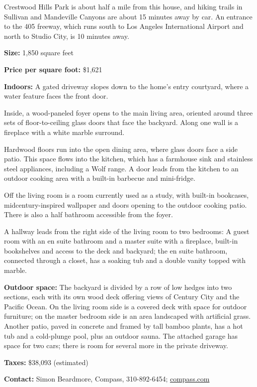 Crestwood Hills Park is about half a mile from this house, and hiking
trails in Sullivan and Mandeville Canyons are about 15 minutes away by
car. An entrance to the 405 freeway, which runs south to Los Angeles
International Airport and north to Studio City, is 10 minutes away.

\textbf{Size:} 1,850 square feet

\textbf{Price per square foot:} \$1,621

\textbf{Indoors:} A gated driveway slopes down to the home's entry
courtyard, where a water feature faces the front door.

Inside, a wood-paneled foyer opens to the main living area, oriented
around three sets of floor-to-ceiling glass doors that face the
backyard. Along one wall is a fireplace with a white marble surround.

Hardwood floors run into the open dining area, where glass doors face a
side patio. This space flows into the kitchen, which has a farmhouse
sink and stainless steel appliances, including a Wolf range. A door
leads from the kitchen to an outdoor cooking area with a built-in
barbecue and mini-fridge.

Off the living room is a room currently used as a study, with built-in
bookcases, midcentury-inspired wallpaper and doors opening to the
outdoor cooking patio. There is also a half bathroom accessible from the
foyer.

A hallway leads from the right side of the living room to two bedrooms:
A guest room with an en suite bathroom and a master suite with a
fireplace, built-in bookshelves and access to the deck and backyard; the
en suite bathroom, connected through a closet, has a soaking tub and a
double vanity topped with marble.

\textbf{Outdoor space:} The backyard is divided by a row of low hedges
into two sections, each with its own wood deck offering views of Century
City and the Pacific Ocean. On the living room side is a covered deck
with space for outdoor furniture; on the master bedroom side is an area
landscaped with artificial grass. Another patio, paved in concrete and
framed by tall bamboo plants, has a hot tub and a cold-plunge pool, plus
an outdoor sauna. The attached garage has space for two cars; there is
room for several more in the private driveway.

\textbf{Taxes:} \$38,093 (estimated)

\textbf{Contact:} Simon Beardmore, Compass, 310-892-6454;
\href{https://www.compass.com/listing/12328-deerbrook-lane-los-angeles-ca-90049/556431858299416017/}{compass.com}

